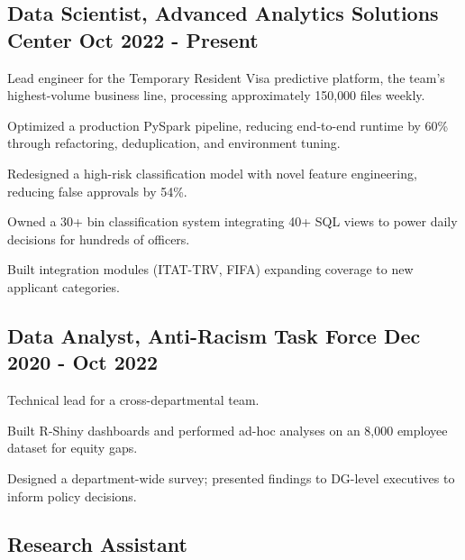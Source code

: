 \subsection{{Data Scientist, Advanced Analytics Solutions Center \hfill {\normalfont Oct 2022 - Present}}}
\begin{zitemize}
    \item Lead engineer for the Temporary Resident Visa predictive platform, the team's highest-volume business line, processing approximately 150{,}000 files weekly.
    \item Optimized a production PySpark pipeline, reducing end-to-end runtime by 60\% through refactoring, deduplication, and environment tuning.
    \item Redesigned a high-risk classification model with novel feature engineering, reducing false approvals by 54\%.
    \item Owned a 30+ bin classification system integrating 40+ SQL views to power daily decisions for hundreds of officers.
    \item Built integration modules (ITAT-TRV, FIFA) expanding coverage to new applicant categories.
\end{zitemize}
\vspace{0.3em}

\subsection{{Data Analyst, Anti-Racism Task Force \hfill {\normalfont Dec 2020 - Oct 2022}}}
\vspace{-0.2em}
\begin{zitemize}
    \item Technical lead for a cross-departmental team.
    \item Built R-Shiny dashboards and performed ad-hoc analyses on an 8,000 employee dataset for equity gaps.
    \item Designed a department-wide survey; presented findings to DG-level executives to inform policy decisions.
\end{zitemize}
\vspace{0.3em}


\subsection{{Research Assistant}}

